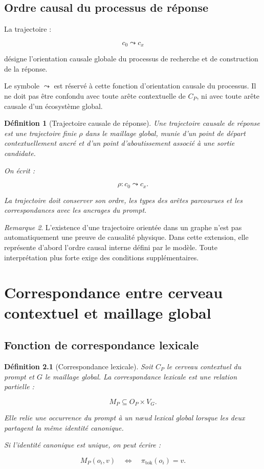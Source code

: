 \documentclass[11pt,a4paper,oneside]{book}
\newtheorem{definition}{Définition}[chapter]
\theoremstyle{remark}
\newtheorem{remarque}[definition]{Remarque}
\begin{document}
\section{Ordre causal du processus de réponse}

La trajectoire :

\[
c_0\leadsto c_x
\]

désigne l'orientation causale globale du processus de recherche et
de construction de la réponse.

Le symbole \(\leadsto\) est réservé à cette fonction d'orientation
causale du processus. Il ne doit pas être confondu avec toute arête
contextuelle de \(C_P\), ni avec toute arête causale d'un écosystème
global.

\begin{definition}[Trajectoire causale de réponse]
Une trajectoire causale de réponse est une trajectoire finie
\(\rho\) dans le maillage global, munie d'un point de départ
contextuellement ancré et d'un point d'aboutissement associé à
une sortie candidate.

On écrit :

\[
\rho:c_0\leadsto c_x.
\]

La trajectoire doit conserver son ordre, les types des arêtes
parcourues et les correspondances avec les ancrages du prompt.
\end{definition}

\begin{remarque}
L'existence d'une trajectoire orientée dans un graphe n'est pas
automatiquement une preuve de causalité physique. Dans cette
extension, elle représente d'abord l'ordre causal interne défini
par le modèle. Toute interprétation plus forte exige des conditions
supplémentaires.
\end{remarque}


\chapter{Correspondance entre cerveau contextuel et maillage global}

\section{Fonction de correspondance lexicale}

\begin{definition}[Correspondance lexicale]
Soit \(C_P\) le cerveau contextuel du prompt et \(G\) le maillage
global. La correspondance lexicale est une relation partielle :

\[
M_P\subseteq O_P\times V_G.
\]

Elle relie une occurrence du prompt à un nœud lexical global lorsque
les deux partagent la même identité canonique.

Si l'identité canonique est unique, on peut écrire :

\[
M_P(o_i,v)
\quad\Longleftrightarrow\quad
\pi_{\mathrm{tok}}(o_i)=v.
\]
\end{definition}
\end{document}
